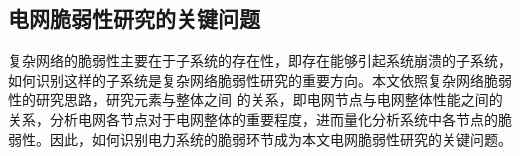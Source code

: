 \subsection{电网脆弱性研究的关键问题}

复杂网络的脆弱性主要在于子系统的存在性，即存在能够引起系统崩溃的子系统，如何识别这样的子系统是复杂网络脆弱性研究的重要方向。本文依照复杂网络脆弱性的研究思路，研究元素与整体之间
的关系，即电网节点与电网整体性能之间的关系，分析电网各节点对于电网整体的重要程度，进而量化分析系统中各节点的脆弱性。因此，如何识别电力系统的脆弱环节成为本文电网脆弱性研究的关键问题。








